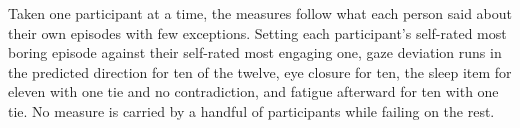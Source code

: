 %

Taken one participant at a time, the measures follow what each person said about their own
episodes with few exceptions. Setting each participant's self-rated most boring episode against
their self-rated most engaging one, gaze deviation runs in the predicted direction for ten of
the twelve, eye closure for ten, the sleep item for eleven with one tie and no contradiction,
and fatigue afterward for ten with one tie. No measure is carried by a handful of participants
while failing on the rest.


